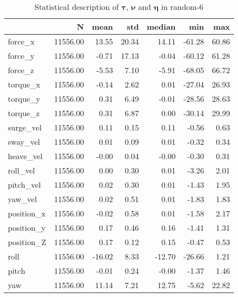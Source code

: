 \begin{table}[hb]
\centering
\caption{Statistical description of $\boldsymbol{\tau}$, $\boldsymbol{\nu}$ and $\boldsymbol{\eta}$ in random-6}
\label{tab:description-random-6}
\begin{tabular}{lrrrrrr}
\toprule
{} &        N &   mean &   std & median &    min &   max \\
\midrule
force\_x    & 11556.00 &  13.55 & 20.34 &  14.11 & -61.28 & 60.86 \\
force\_y    & 11556.00 &  -0.71 & 17.13 &  -0.04 & -60.12 & 61.28 \\
force\_z    & 11556.00 &  -5.53 &  7.10 &  -5.91 & -68.05 & 66.72 \\
torque\_x   & 11556.00 &  -0.14 &  2.62 &   0.01 & -27.04 & 26.93 \\
torque\_y   & 11556.00 &   0.31 &  6.49 &  -0.01 & -28.56 & 28.63 \\
torque\_z   & 11556.00 &   0.31 &  6.87 &   0.00 & -30.14 & 29.99 \\
surge\_vel  & 11556.00 &   0.11 &  0.15 &   0.11 &  -0.56 &  0.63 \\
sway\_vel   & 11556.00 &   0.01 &  0.09 &   0.01 &  -0.32 &  0.34 \\
heave\_vel  & 11556.00 &  -0.00 &  0.04 &  -0.00 &  -0.30 &  0.31 \\
roll\_vel   & 11556.00 &   0.00 &  0.30 &   0.01 &  -3.26 &  2.01 \\
pitch\_vel  & 11556.00 &   0.02 &  0.30 &   0.01 &  -1.43 &  1.95 \\
yaw\_vel    & 11556.00 &   0.02 &  0.51 &   0.01 &  -1.83 &  1.83 \\
position\_x & 11556.00 &  -0.02 &  0.58 &   0.01 &  -1.58 &  2.17 \\
position\_y & 11556.00 &   0.17 &  0.46 &   0.16 &  -1.41 &  1.31 \\
position\_Z & 11556.00 &   0.17 &  0.12 &   0.15 &  -0.47 &  0.53 \\
roll       & 11556.00 & -16.02 &  8.33 & -12.70 & -26.66 &  1.21 \\
pitch      & 11556.00 &  -0.01 &  0.24 &  -0.00 &  -1.37 &  1.46 \\
yaw        & 11556.00 &  11.14 &  7.21 &  12.75 &  -5.62 & 22.82 \\
\bottomrule
\end{tabular}
\end{table}
